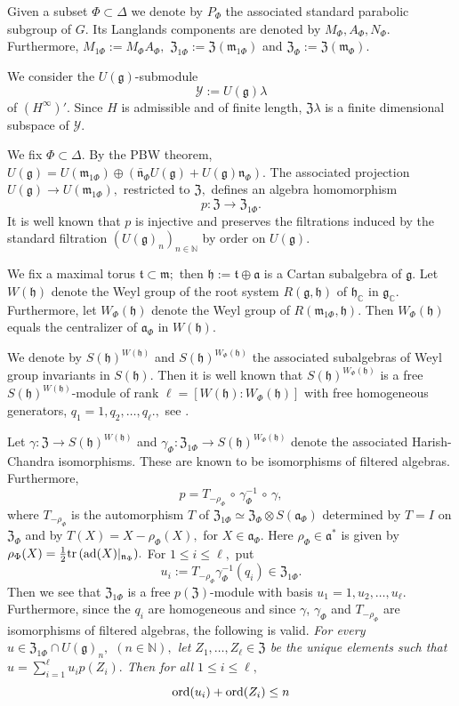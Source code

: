 \documentclass[12pt,a4paper]{article}
\def\medno{\medbreak\noindent}
\def\msy#1{{\mathbb #1}}
\def\C{{\msy C}}
\def\N{{\msy N}}
\def\gg{\gamma}
\def\gl{\lambda}
\def\gD{\Delta}
\def\got#1{\mathfrak #1}
\def\fa{{\got a}}
\def\fg{{\got g}}
\def\fh{{\got h}}
\def\fm{{\got m}}
\def\fn{{\got n}}
\def\ft{{\got t}}
\def\to{\rightarrow}
\def\ad{{\rm ad}}
\def\after{\,{\scriptstyle\circ}\,}
\def\tr{{\rm tr}\,}
\def\iC{{\scriptscriptstyle \C}}
\def\cY{{\mathcal Y}}
\numberwithin{Thm}{section}
\numberwithin{equation}{section}
\def\fZ{{\mathfrak Z}}
\numberwithin{equation}{section}
\def\fZ{{\mathfrak Z}}
\def\ft{\mathfrak t}
\def\fh{{\mathfrak h}}
\def\ord{{\rm ord}}
\begin{document}
Given a subset $\Phi \subset \gD$ 
we denote by $P_\Phi$ the associated standard parabolic subgroup of $G.$ 
Its Langlands components  are denoted by $M_\Phi, A_\Phi, N_\Phi.$ Furthermore, $M_{1\Phi} := M_\Phi A_\Phi,$ $\fZ_{1\Phi}:= \fZ(\fm_{1\Phi})$ and $\fZ_\Phi:= \fZ(\fm_\Phi).$ 

We consider 
the $U(\fg)$-submodule 
$$ 
\cY:= U(\fg)\gl
$$%
of $(H^\infty)'.$ 
Since $H$ is admissible and of finite length, $\fZ \gl$ is a finite
dimensional subspace of $\cY.$ 

We fix $\Phi \subset \gD.$  
By the PBW theorem, $U(\fg) = U(\fm_{1\Phi}) \oplus (\bar \fn_\Phi U(\fg) + U(\fg) \fn_\Phi).$ 
The associated projection $U(\fg) \to U(\fm_{1\Phi}),$ restricted to $\fZ,$ defines an 
algebra homomorphism
\begin{equation}
 \label{e: defi homomorphism p}
p: \fZ \to \fZ_{1\Phi}.
\end{equation} 
It is well known that $p$ is injective and preserves the filtrations
induced by the standard filtration $(U(\fg)_n)_{n \in \N}$ by order on $U(\fg).$ 

We fix a maximal torus $\ft \subset \fm;$ then $\fh:= \ft \oplus \fa$ is a Cartan subalgebra
of $\fg. $ Let $W(\fh)$ denote the Weyl group of the root system $R(\fg, \fh)$ 
of $\fh_\iC$ in $\fg_\iC.$ 
Furthermore, let $W_\Phi(\fh)$ denote the Weyl group of $R(\fm_{1\Phi}, \fh).$ 
Then $W_\Phi(\fh)$ equals the centralizer of $\fa_\Phi$ in $W(\fh).$ 

We denote by $S(\fh)^{W(\fh)}$ and $S(\fh)^{W_\Phi(\fh)}$ the associated
subalgebras of Weyl group invariants in $S(\fh).$ Then it is well known that
$S(\fh)^{W_\Phi(\fh)}$ 
is a free $S(\fh)^{W(\fh)}$-module of rank $\ell = [W(\fh): W_\Phi(\fh)]$ 
with free homogeneous generators, $q_1 =1, q_2, \ldots , q_\ell.,$ 
see \cite[Thm 2.1.3.6]{Warn1}. 

Let $\gg: \fZ \to S(\fh)^{W(\fh)}$ and $\gg_\Phi: \fZ_{1\Phi} \to S(\fh)^{W_\Phi(\fh)}$ 
denote the associated Harish-Chandra isomorphisms. These are known to
be isomorphisms of filtered algebras. Furthermore,
$$ 
p = T_{-\rho_\Phi} \after \gg_\Phi^{-1}\after  \gg,
$$ 
where $T_{-\rho_\Phi}$ is the automorphism $T$ of $\fZ_{1\Phi}\simeq \fZ_\Phi \otimes S(\fa_\Phi)$ determined by $T = I $ on $\fZ_\Phi$ and by $T(X)= X - \rho_\Phi(X),$ for $X \in \fa_\Phi.$ 
Here $\rho_\Phi \in \fa^*$ is given by $\rho_\Phi(X) = \frac12 \tr (\ad(X)|_{\fn_\Phi}).$ 
For $1\leq i \leq \ell,$ put  
$$
u_i := T_{-\rho_\Phi}\gg_\Phi^{-1}(q_i) \in \fZ_{1\Phi}.
$$
Then we see that $\fZ_{1\Phi}$ is a free $p(\fZ)$-module with basis $u_1=1 , u_2, \ldots, u_\ell.$
Furthermore, since the $q_i$ are homogeneous and since $\gg$, $\gg_\Phi$ and $T_{-\rho_\Phi}$ are isomorphisms
of filtered algebras, the following is valid.
\medno\sl
For every $u \in \fZ_{1\Phi} \cap U(\fg)_n,$ $(n \in \N),$ let $Z_1, \ldots , Z_\ell\in \fZ$ 
be the unique elements such that $u = \sum_{i=1}^\ell u_i p(Z_i).$ Then 
for all $1\leq i \leq \ell,$
\begin{equation}
\label{e: estimation orders}
\ord(u_i) + \ord(Z_i) \leq n 
\end{equation}\rm
 
\end{document}
